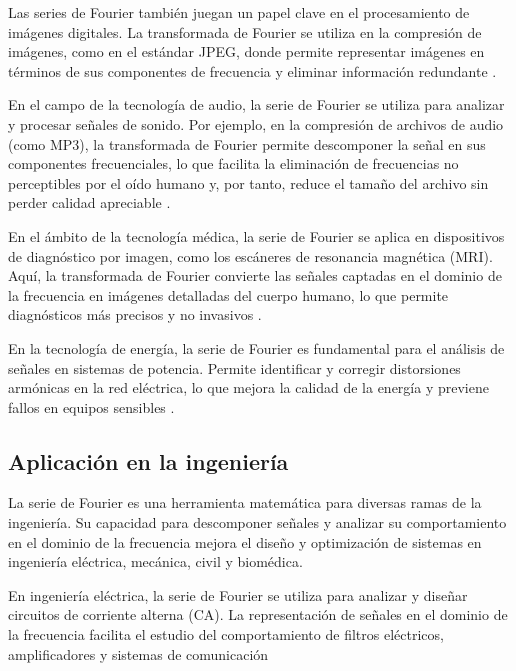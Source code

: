 {Las series de Fourier también juegan un papel clave en el procesamiento de imágenes digitales. La transformada de Fourier se utiliza en la compresión de imágenes, como en el estándar JPEG, donde permite representar imágenes en términos de sus componentes de frecuencia y eliminar información redundante \cite{gonzalez2017digital}.
\vspace{10pt}

En el campo de la tecnología de audio, la serie de Fourier se utiliza para analizar y procesar señales de sonido. Por ejemplo, en la compresión de archivos de audio (como MP3), la transformada de Fourier permite descomponer la señal en sus componentes frecuenciales, lo que facilita la eliminación de frecuencias no perceptibles por el oído humano y, por tanto, reduce el tamaño del archivo sin perder calidad apreciable \cite{oppenheim2010discrete}.
\vspace{10pt}

En el ámbito de la tecnología médica, la serie de Fourier se aplica en dispositivos de diagnóstico por imagen, como los escáneres de resonancia magnética (MRI). Aquí, la transformada de Fourier convierte las señales captadas en el dominio de la frecuencia en imágenes detalladas del cuerpo humano, lo que permite diagnósticos más precisos y no invasivos \cite{haacke2014magnetic}.
\vspace{10pt}

En la tecnología de energía, la serie de Fourier es fundamental para el análisis de señales en sistemas de potencia. Permite identificar y corregir distorsiones armónicas en la red eléctrica, lo que mejora la calidad de la energía y previene fallos en equipos sensibles \cite{mcgranghan2017power}.

\subsection{Aplicación en la ingeniería}

La serie de Fourier es una herramienta matemática para diversas ramas de la ingeniería. Su capacidad para descomponer señales y analizar su comportamiento en el dominio de la frecuencia mejora el diseño y optimización de sistemas en ingeniería eléctrica, mecánica, civil y biomédica.
\vspace{10pt}

En ingeniería eléctrica, la serie de Fourier se utiliza para analizar y diseñar circuitos de corriente alterna (CA). La representación de señales en el dominio de la frecuencia facilita el estudio del comportamiento de filtros eléctricos, amplificadores y sistemas de comunicación \cite{haykin2001communication}
\vspace{10pt}

}
